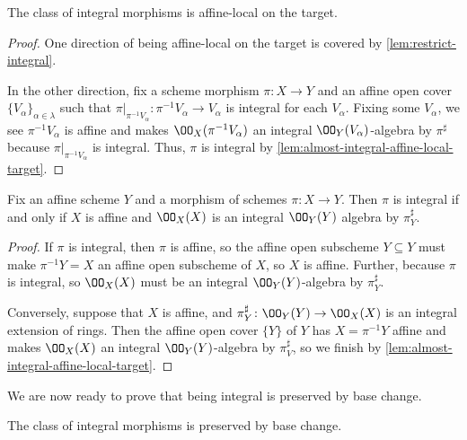 \documentclass[../notes.tex]{subfiles}
\begin{document}
\begin{corollary} \label{cor:integral-affine-local-target}
	The class of integral morphisms is affine-local on the target.
\end{corollary}
\begin{proof}
	One direction of being affine-local on the target is covered by \autoref{lem:restrict-integral}.

	In the other direction, fix a scheme morphism $\pi\colon X\to Y$ and an affine open cover $\{V_\alpha\}_{\alpha\in\lambda}$ such that $\pi|_{\pi^{-1}V_\alpha}\colon\pi^{-1}V_\alpha\to V_\alpha$ is integral for each $V_\alpha$. Fixing some $V_\alpha$, we see $\pi^{-1}V_\alpha$ is affine and makes $\OO_X(\pi^{-1}V_\alpha)$ an integral $\OO_Y(V_\alpha)$-algebra by $\pi^\sharp$ because $\pi|_{\pi^{-1}V_\alpha}$ is integral. Thus, $\pi$ is integral by \autoref{lem:almost-integral-affine-local-target}.
\end{proof}
\begin{corollary} \label{cor:affine-integral-condition}
	Fix an affine scheme $Y$ and a morphism of schemes $\pi\colon X\to Y$. Then $\pi$ is integral if and only if $X$ is affine and $\OO_X(X)$ is an integral $\OO_Y(Y)$ algebra by $\pi^\sharp_Y$.
\end{corollary}
\begin{proof}
	If $\pi$ is integral, then $\pi$ is affine, so the affine open subscheme $Y\subseteq Y$ must make $\pi^{-1}Y=X$ an affine open subscheme of $X$, so $X$ is affine. Further, because $\pi$ is integral, so $\OO_X(X)$ must be an integral $\OO_Y(Y)$-algebra by $\pi^\sharp_Y$.

	Conversely, suppose that $X$ is affine, and $\pi^\sharp_Y\colon\OO_Y(Y)\to\OO_X(X)$ is an integral extension of rings. Then the affine open cover $\{Y\}$ of $Y$ has $X=\pi^{-1}Y$ affine and makes $\OO_X(X)$ an integral $\OO_Y(Y)$-algebra by $\pi^\sharp_V$, so we finish by \autoref{lem:almost-integral-affine-local-target}.
\end{proof}
We are now ready to prove that being integral is preserved by base change.
\begin{lemma}
	The class of integral morphisms is preserved by base change.
\end{lemma}
\end{document}
